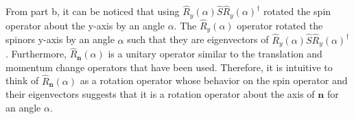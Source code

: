 \begin{sol}
\begin{enumerate}[label=\textbf{(\alph*)}]
From part b, it can be noticed that using $\hat R_y(\alpha)\hat S\hat R_y(\alpha)^\dagger$  rotated the spin operator about the y-axis by an angle $\alpha$. The $\hat R_y(\alpha)$ operator rotated the spinors y-axis by an angle $\alpha$ such that they are eigenvectors of $\hat R_y(\alpha)\hat S\hat R_y(\alpha)^\dagger$. Furthermore, $\hat R_\mathbf{n}(\alpha)$ is a unitary operator similar to the translation and momentum change operators that have been used. Therefore, it is intuitive to think of  $\hat R_\mathbf{n}(\alpha)$ as a rotation operator whose behavior on the spin operator and their eigenvectors suggests that it is a rotation operator about the axis of $\mathbf{n}$ for an angle $\alpha$.
\end{enumerate}
\end{sol}